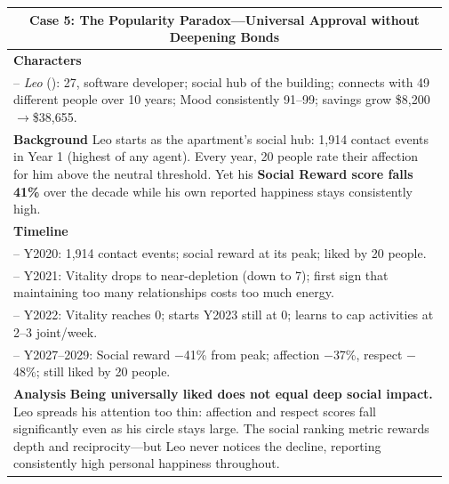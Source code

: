 \begin{table}[htbp]
\begin{tabular}{p{0.97\linewidth}}
\multicolumn{1}{c}{\textbf{Case 5: The Popularity Paradox---Universal Approval without Deepening Bonds}}\\
\midrule
\textbf{Characters}\\
\quad -- \textit{Leo} (\apartment{}): 27, software developer;
  social hub of the building;
  connects with 49 different people over 10 years;
  Mood consistently 91--99; savings grow \$8,200$\to$\$38,655.\\[2pt]
\textbf{Background}\quad
Leo starts as the apartment's social hub: 1,914 contact events in Year 1 (highest of any agent).
Every year, 20 people rate their affection for him above the neutral threshold.
Yet his \textbf{Social Reward score falls 41\%} over the decade while his own reported
happiness stays consistently high.\\[2pt]
\textbf{Timeline}\\
\quad -- Y2020: 1,914 contact events; social reward at its peak;
  liked by 20 people.\\
\quad -- Y2021: Vitality drops to near-depletion (down to 7);
  first sign that maintaining too many relationships costs too much energy.\\
\quad -- Y2022: Vitality reaches 0; starts Y2023 still at 0;
  learns to cap activities at 2--3 joint/week.\\
\quad -- Y2027--2029: Social reward $-$41\% from peak;
  affection $-$37\%, respect $-$48\%;
  still liked by 20 people.\\[2pt]
\textbf{Analysis}\quad
\textbf{Being universally liked does not equal deep social impact.}
Leo spreads his attention too thin:
affection and respect scores fall significantly even as his circle stays large.
The social ranking metric rewards depth and reciprocity---but Leo never notices the decline,
reporting consistently high personal happiness throughout.\\

\midrule


\end{tabular}
\end{table}
